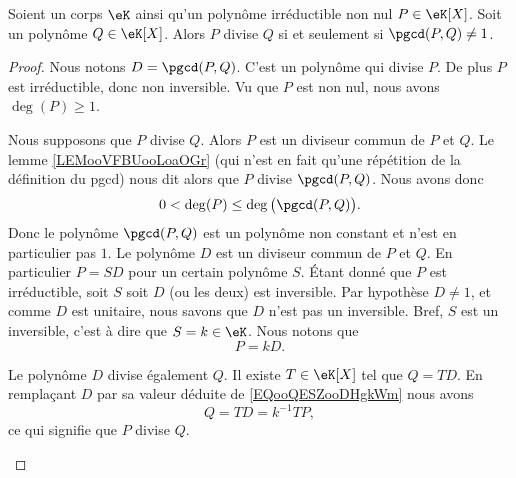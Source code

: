 \begin{lemma}       \label{LEMooVWBPooQITlUL}
    Soient un corps \( \eK\) ainsi qu'un polynôme irréductible non nul \( P\in \eK[X]\). Soit un polynôme \( Q\in \eK[X]\). Alors \( P\) divise \( Q\) si et seulement si \( \pgcd(P,Q)\neq 1\).
\end{lemma}

\begin{proof}
        Nous notons \( D=\pgcd(P,Q)\). C'est un polynôme qui divise \( P\). De plus \( P\) est irréductible, donc non inversible. Vu que \( P\) est non nul, nous avons \( \deg(P)\geq 1\).
    \begin{subproof}
        \spitem[$ \Rightarrow$]
        Nous supposons que \( P\) divise \( Q\). Alors \( P\) est un diviseur commun de \( P\) et \( Q\). Le lemme \ref{LEMooVFBUooLoaOGr} (qui n'est en fait qu'une répétition de la définition du pgcd) nous dit alors que \( P\) divise \( \pgcd(P,Q)\). Nous avons donc
        \begin{equation}
            0<\deg(P)\leq \deg\big( \pgcd(P,Q) \big).
        \end{equation}
        Donc le polynôme \( \pgcd(P,Q)\) est un polynôme non constant et n'est en particulier pas \( 1\).
        \spitem[$ \Leftarrow$]
        Le polynôme \( D\) est un diviseur commun de \( P\) et \( Q\). En particulier \( P=SD\) pour un certain polynôme \( S\). Étant donné que \( P\) est irréductible, soit \( S\) soit \( D\) (ou les deux) est inversible. Par hypothèse \( D\neq 1\), et comme \( D\) est unitaire, nous savons que \( D\) n'est pas un inversible. Bref, \( S\) est un inversible, c'est à dire que \( S=k\in \eK\). Nous notons que 
        \begin{equation}        \label{EQooQESZooDHgkWm}
            P=kD.
        \end{equation}
        
        Le polynôme \( D\) divise également \( Q\). Il existe \( T\in \eK[X]\) tel que \( Q=TD\). En remplaçant \( D\) par sa valeur déduite de \eqref{EQooQESZooDHgkWm} nous avons
        \begin{equation}
            Q=TD=k^{-1} TP,
        \end{equation}
        ce qui signifie que \( P\) divise \( Q\).
    \end{subproof}
\end{proof}

